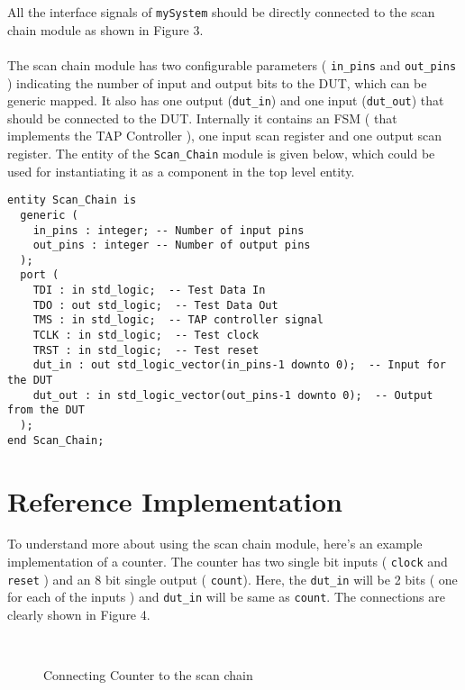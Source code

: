 \documentclass[a4paper,11pt]{article}
\begin{document}
All the interface signals of \texttt{mySystem} should be directly connected to the scan chain module as shown in Figure 3. 
\paragraph*{}

The scan chain module has two configurable parameters ( \texttt{in\_pins} and \texttt{out\_pins} ) indicating the number of input and output bits to the DUT, which can be generic mapped. It also has one output (\texttt{dut\_in}) and one input (\texttt{dut\_out}) that should be connected to the DUT. Internally it contains an FSM ( that implements the TAP Controller ), one input scan register and one output scan register. The entity of the \texttt{Scan\_Chain} module is given below, which could be used for instantiating it as a component in the top level entity.

\begin{verbatim}
entity Scan_Chain is
  generic (
    in_pins : integer; -- Number of input pins
    out_pins : integer -- Number of output pins
  );
  port (
    TDI : in std_logic;  -- Test Data In
    TDO : out std_logic;  -- Test Data Out
    TMS : in std_logic;  -- TAP controller signal
    TCLK : in std_logic;  -- Test clock
    TRST : in std_logic;  -- Test reset
    dut_in : out std_logic_vector(in_pins-1 downto 0);  -- Input for the DUT
    dut_out : in std_logic_vector(out_pins-1 downto 0);  -- Output from the DUT
  );
end Scan_Chain;
\end{verbatim}

\section{Reference Implementation}

To understand more about using the scan chain module, here's an example implementation of a counter. The counter has two single bit inputs ( \texttt{clock} and \texttt{reset} ) and an 8 bit single output ( \texttt{count}). Here, the \texttt{dut\_in} will be 2 bits ( one for each of the inputs ) and \texttt{dut\_in} will be same as \texttt{count}. The connections are clearly shown in Figure 4.

\begin{figure}[h!]
\centering
\\
\caption{Connecting Counter to the scan chain}
\end{figure}
\end{document}

